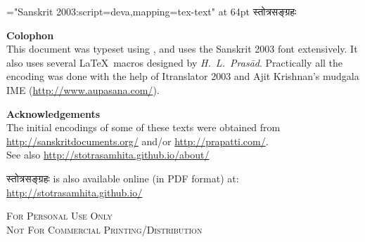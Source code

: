 \thispagestyle{empty}
\begin{titlepage}
\vspace*{6.5cm}\centerline{\font\x="Sanskrit 2003:script=deva,mapping=tex-text" at 64pt \x स्तोत्रसङ्ग्रहः}
\end{titlepage}
\begin{center}
\parbox{10cm}{
{\Large \textbf{Colophon}}\\
\noindent This document was typeset using \XeLaTeX, and uses the Sanskrit 2003 font extensively. It also uses several \LaTeX\ macros designed by \textit{H.~L.~Prasād}. Practically all the encoding was done with the help of Itranslator 2003 and Ajit Krishnan's mudgala IME (\url{http://www.aupasana.com/}).\\
\vspace*{5cm}

{\large \textbf{Acknowledgements}}\\
The initial encodings of some of these texts were obtained from \url{http://sanskritdocuments.org/} and/or \url{http://prapatti.com/}.  \\
See also \url{http://stotrasamhita.github.io/about/}


\vspace*{1cm}
\begin{center}
{ स्तोत्रसङ्ग्रहः} is also available online (in PDF format) at: \\
\url{http://stotrasamhita.github.io/}

\vspace*{2cm}

{\scshape{For Personal Use Only\\
 Not For Commercial Printing/Distribution}}
\end{center}
}
\end{center}
\clearemptydoublepage
\setcounter{page}{0}
\renewcommand{\chaptermark}[1]{%
\markboth{#1}{}}
\begin{center}
\begin{large}
\tableofcontents
\end{large}
\end{center}

\mbox{}
\clearpage
\thispagestyle{empty}
\clearemptydoublepage

\clearemptydoublepage

\clearemptydoublepage

\newpage
\clearemptydoublepage

